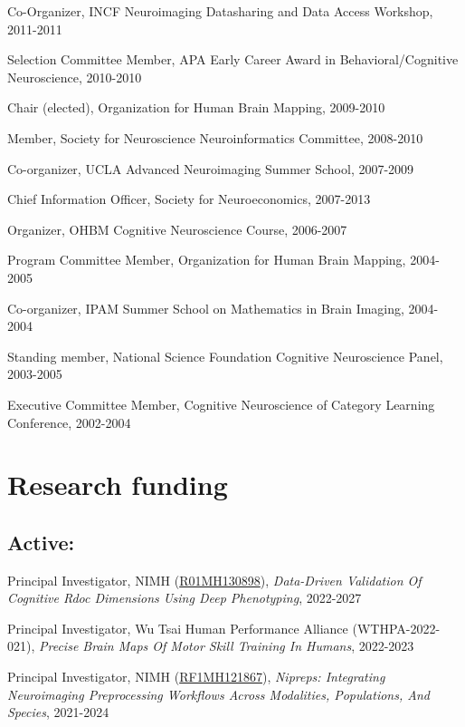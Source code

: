 \documentclass[10pt, letterpaper]{article}
\begin{document}
Co-Organizer,  INCF Neuroimaging Datasharing and Data Access Workshop, 2011-2011 

Selection Committee Member, APA Early Career Award in Behavioral/Cognitive Neuroscience, 2010-2010 

Chair (elected), Organization for Human Brain Mapping, 2009-2010 

Member, Society for Neuroscience Neuroinformatics Committee, 2008-2010 

Co-organizer, UCLA Advanced Neuroimaging Summer School, 2007-2009 

Chief Information Officer, Society for Neuroeconomics, 2007-2013 

Organizer, OHBM Cognitive Neuroscience Course, 2006-2007 

Program Committee Member, Organization for Human Brain Mapping, 2004-2005 

Co-organizer, IPAM Summer School on Mathematics in Brain Imaging, 2004-2004 

Standing member, National Science Foundation Cognitive Neuroscience Panel, 2003-2005 

Executive Committee Member, Cognitive Neuroscience of Category Learning Conference, 2002-2004 

\section*{Research funding}
\noindent

\subsection*{Active:}

Principal Investigator, NIMH (\href{https://reporter.nih.gov/project-details/10515980}{R01MH130898}), \textit{Data-Driven Validation Of Cognitive Rdoc Dimensions Using Deep Phenotyping}, 2022-2027 \vspace{2mm}

Principal Investigator, Wu Tsai Human Performance Alliance (WTHPA-2022-021), \textit{Precise Brain Maps Of Motor Skill Training In Humans}, 2022-2023 \vspace{2mm}

Principal Investigator, NIMH (\href{https://reporter.nih.gov/project-details/10260312}{RF1MH121867}), \textit{Nipreps: Integrating Neuroimaging Preprocessing Workflows Across Modalities, Populations, And Species}, 2021-2024 \vspace{2mm}
\end{document}
